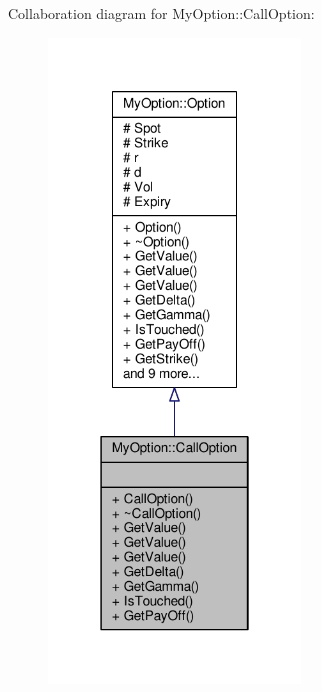 Collaboration diagram for My\+Option\+:\+:Call\+Option\+:
\nopagebreak
\begin{figure}[H]
\begin{center}
\leavevmode
\includegraphics[width=190pt]{classMyOption_1_1CallOption__coll__graph}
\end{center}
\end{figure}
